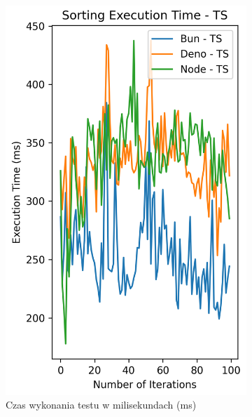 \begin{figure}[H]
  \centering
  \begin{subfigure}[b]{0.4\textwidth}
    \centering
    \includegraphics[width=\textwidth]{Figures/sorting/sorting_bubble_100_10000_ts_time.png}
    \caption{Czas wykonania testu w milisekundach (ms)}
    \label{fig:bubble_sorting_e3_ts_time}
  \end{subfigure}
  \begin{subfigure}[b]{0.4\textwidth}
    \centering

\end{subfigure}
\end{figure}
